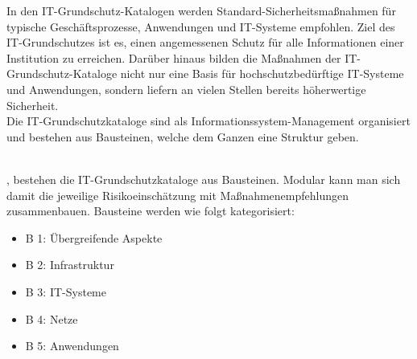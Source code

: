  \label{Aufbau Grundschutzkataloge}
 \DIFdelbegin %
\DIFdelend %
 \DIFaddbegin {}\DIFaddend In den IT-Grundschutz-Katalogen werden Standard-Sicherheitsmaßnahmen für typische Geschäftsprozesse, 
	Anwendungen und IT-Systeme empfohlen. Ziel des IT-Grundschutzes ist es, 
	einen angemessenen Schutz für alle Informationen einer Institution zu erreichen. 
	Darüber hinaus bilden die Maßnahmen der IT-Grundschutz-Kataloge nicht nur 
	eine Basis für hochschutzbedürftige IT-Systeme und Anwendungen, 
	sondern liefern an vielen Stellen bereits höherwertige Sicherheit. \\
	Die IT-Grundschutzkataloge sind als Informationssystem-Management organisiert und 
	bestehen aus Bausteinen, welche dem Ganzen eine Struktur geben.
 \DIFdelbegin %
\DIFdelend %
 \pagebreak 

 \label{Bausteine}
 \DIFdelbegin %
\DIFdelend %
 \DIFaddbegin {}\\
 	\DIFaddend , bestehen die IT-Grundschutzkataloge aus Bausteinen.
 	Modular kann man sich damit \DIFdelbegin {}\DIFdelend die jeweilige Risikoeinschätzung mit Maßnahmenempfehlungen zusammenbauen.
 	Bausteine werden wie folgt kategorisiert:

 	\begin{itemize}
 		\item B 1: Übergreifende Aspekte
 		\item B 2: Infrastruktur
 		\item B 3: IT-Systeme
 		\item B 4: Netze
 		\item B 5: Anwendungen
 	\end{itemize} 
 	\DIFaddbegin 

